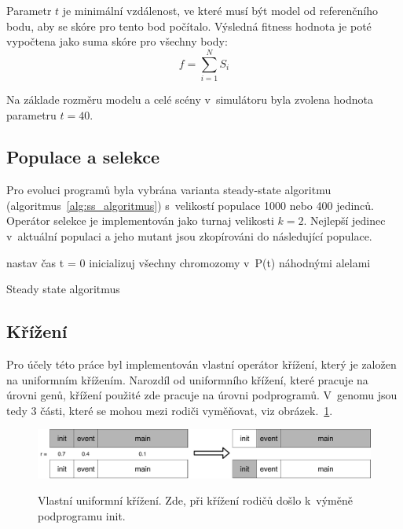 Parametr $t$ je minimální vzdálenost, ve které musí být model od referenčního bodu, aby se skóre pro tento bod počítalo.
Výsledná fitness hodnota je poté vypočtena jako suma skóre pro všechny body:
$$f=\sum_{i=1}^{N}S_i$$

Na základe rozměru modelu a celé scény v~simulátoru byla zvolena hodnota parametru $t = 40$.

\subsection{Populace a selekce}
Pro evoluci programů byla vybrána varianta steady-state algoritmu (algoritmus~\ref{alg:ss_algoritmus}) s~velikostí populace 1000 nebo 400 jedinců.
Operátor selekce je implementován jako turnaj velikosti $k = 2$.
Nejlepší jedinec v~aktuální populaci a jeho mutant jsou zkopírováni do následující populace.

\begin{algorithm}[H]

    nastav čas t = 0\;
    inicializuj všechny chromozomy v~P(t) náhodnými alelami\;

    \caption{Steady state algoritmus}
    \label{alg:ss_algoritmus}
\end{algorithm}

\subsection{Křížení}
\label{subs:krizeni_podprogramu}
Pro účely této práce byl implementován vlastní operátor křížení, který je založen na uniformním křížením.
Narozdíl od uniformního křížení, které pracuje na úrovni genů, křížení použité zde pracuje na úrovni podprogramů.
V~genomu jsou tedy 3 části, které se mohou mezi rodiči vyměňovat, viz obrázek.~\ref{fig:krizeni_podprogramu}.

\begin{figure}[h]
    \centering
    {\includegraphics[width=35em]{obrazky/krizeni_podprogramu.pdf}}
    \caption[Vlastní uniformní křížení]{
    Vlastní uniformní křížení.
    Zde, při křížení rodičů došlo k~výměně podprogramu init.
    }
    \label{fig:krizeni_podprogramu}
\end{figure}

